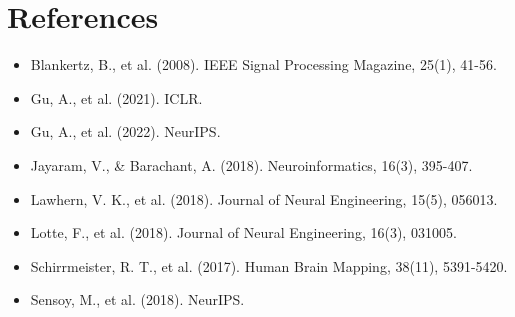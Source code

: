 \documentclass[11pt,a4paper]{article}
\begin{document}
\section{References}
\begin{itemize}
    \item Blankertz, B., et al. (2008). IEEE Signal Processing Magazine, 25(1), 41-56.
    \item Gu, A., et al. (2021). ICLR.
    \item Gu, A., et al. (2022). NeurIPS.
    \item Jayaram, V., \& Barachant, A. (2018). Neuroinformatics, 16(3), 395-407.
    \item Lawhern, V. K., et al. (2018). Journal of Neural Engineering, 15(5), 056013.
    \item Lotte, F., et al. (2018). Journal of Neural Engineering, 16(3), 031005.
    \item Schirrmeister, R. T., et al. (2017). Human Brain Mapping, 38(11), 5391-5420.
    \item Sensoy, M., et al. (2018). NeurIPS.
\end{itemize}
\end{document}
